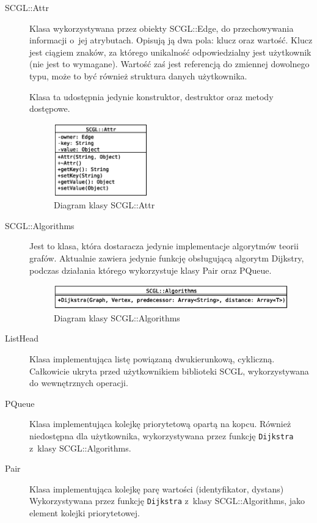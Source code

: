 \documentclass[a4paper,12pt,polish,oneside,openright]{thesis}
\newcommand\code[1]{\lstinline[style=line]{#1}}
\begin{document}
\begin{description}
	\item[SCGL::Attr]
	Klasa wykorzystywana przez obiekty SCGL::Edge, do przechowywania informacji o~jej atrybutach.
	Opisują ją dwa pola: klucz oraz wartość.
	Klucz jest ciągiem znaków, za którego unikalność odpowiedzialny jest użytkownik (nie jest to wymagane).
	Wartość zaś jest referencją do zmiennej dowolnego typu, może to być również struktura danych użytkownika.
	
	Klasa ta udostępnia jedynie konstruktor, destruktor oraz metody dostępowe.
	\begin{figure}[htb]
	\begin{center}
		\includegraphics[width=0.4\textwidth]{gfx/class_attr.eps}
		\caption{Diagram klasy SCGL::Attr}
	\end{center}
	\end{figure}

	\item[SCGL::Algorithms]
	Jest to klasa, która dostaracza jedynie implementacje algorytmów teorii grafów.
	Aktualnie zawiera jedynie funkcję obsługującą algorytm Dijkstry, podczas działania którego wykorzystuje klasy Pair oraz PQueue.
	\begin{figure}[htb]
	\begin{center}
		\includegraphics[width=1.0\textwidth]{gfx/class_algo.eps}
		\caption{Diagram klasy SCGL::Algorithms}
	\end{center}
	\end{figure}

	\item[ListHead]
	Klasa implementująca listę powiązaną dwukierunkową, cykliczną.
	Całkowicie ukryta przed użytkownikiem biblioteki SCGL, wykorzystywana do wewnętrznych operacji.

	\item[PQueue]
	Klasa implementująca kolejkę priorytetową opartą na kopcu.
	Również niedostępna dla użytkownika, wykorzystywana przez funkcję \code{Dijkstra} z~klasy SCGL::Algorithms.

	\item[Pair]
	Klasa implementująca kolejkę parę wartości (identyfikator, dystans)
	Wykorzystywana przez funkcję \code{Dijkstra} z~klasy SCGL::Algorithms, jako element kolejki priorytetowej.
\end{description}
\end{document}
